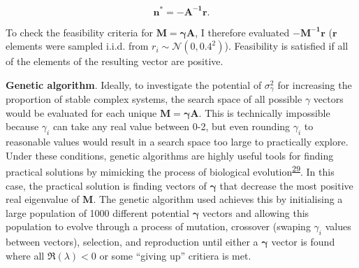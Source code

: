 \documentclass[]{article}
\begin{document}
\[\mathbf{n^{*} = -A^{-1}r}.\]

To check the feasibility criteria for \(\mathbf{M = \gamma A}\), I
therefore evaluated \(\mathbf{-M^{-1}r}\) (\(\mathbf{r}\) elements were
sampled i.i.d. from \(r_{i} \sim \mathcal{N}(0, 0.4^{2})\)). Feasibility
is satisfied if all of the elements of the resulting vector are
positive.

\textbf{Genetic algorithm}. Ideally, to investigate the potential of
\(\sigma^{2}_{\gamma}\) for increasing the proportion of stable complex
systems, the search space of all possible \(\gamma\) vectors would be
evaluated for each unique \(\mathbf{M = \gamma A}\). This is technically
impossible because \(\gamma_{i}\) can take any real value between 0-2,
but even rounding \(\gamma_{i}\) to reasonable values would result in a
search space too large to practically explore. Under these conditions,
genetic algorithms are highly useful tools for finding practical
solutions by mimicking the process of biological
evolution\textsuperscript{\protect\hyperlink{ref-Hamblin2013}{29}}. In
this case, the practical solution is finding vectors of
\(\mathbf{\gamma}\) that decrease the most positive real eigenvalue of
\(\mathbf{M}\). The genetic algorithm used achieves this by initialising
a large population of 1000 different potential \(\mathbf{\gamma}\)
vectors and allowing this population to evolve through a process of
mutation, crossover (swaping \(\gamma_{i}\) values between vectors),
selection, and reproduction until either a \(\mathbf{\gamma}\) vector is
found where all \(\Re(\lambda) < 0\) or some ``giving up'' critiera is
met.
\end{document}
